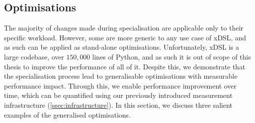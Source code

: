 



\subsection{Optimisations}
\label{sec:specialising-pattern-rewriting-optimisations}

The majority of changes made during specialisation are applicable only to their specific workload.
However, some are more generic to any use case of xDSL, and as such can be applied as stand-alone optimisations. Unfortunately, xDSL is a large codebase, over $150,000$ lines of Python, and as such it is out of scope of this thesis to improve the performance of all of it.
Despite this, we demonstrate that the specialisation process lead to generalisable optimisations with measurable performance impact.
Through this, we enable performance improvement over time, which can be quantified using our previously introduced measurement infrastructure (\autoref{ssec:infrastructure}).
In this section, we discuss three salient examples of the generalised optimisations.


